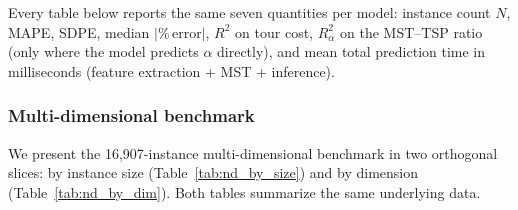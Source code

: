Every table below reports the same seven quantities per model: instance count $N$, MAPE, SDPE, median $|\%\,\text{error}|$, $R^2$ on tour cost, $R^2_\alpha$ on the MST--TSP ratio (only where the model predicts $\alpha$ directly), and mean total prediction time in milliseconds (feature extraction + MST + inference).

\subsubsection{Multi-dimensional benchmark} \label{subsec:results_nd}

We present the 16{,}907-instance multi-dimensional benchmark in two orthogonal slices: by instance size (Table~\ref{tab:nd_by_size}) and by dimension (Table~\ref{tab:nd_by_dim}). Both tables summarize the same underlying data.


